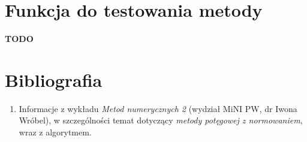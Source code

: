 \documentclass[12pt]{article}
\begin{document}
	\section{Funkcja do testowania metody}
	\textbf{TODO}
	
	
	
	\section{Bibliografia}
	\begin{enumerate}
		\item Informacje z wykładu \textit{Metod numerycznych 2} (wydział MiNI PW, dr Iwona Wróbel), w szczególności temat dotyczący \textit{metody potęgowej z normowaniem}, wraz z algorytmem.
	\end{enumerate}
	
\end{document}
